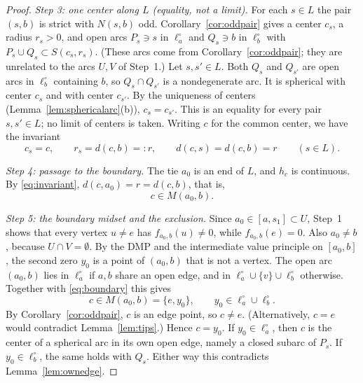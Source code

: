 \documentclass[11pt]{amsart}
\theoremstyle{definition}
\theoremstyle{remark}
\newcommand{\M}{M}
\newcommand{\N}{N}
\begin{document}
\begin{proof}
\emph{Step 3: one center along $L$ (equality, not a limit).} For each $s\in L$ the pair $(s,b)$ is strict with $\N(s,b)$ odd. Corollary~\ref{cor:oddpair} gives a center $c_s$, a radius $r_s>0$, and open arcs $P_s\ni s$ in $\ell_a^\circ$ and $Q_s\ni b$ in $\ell_b^\circ$ with $P_s\cup Q_s\subset S(c_s,r_s)$. (These arcs come from Corollary~\ref{cor:oddpair}; they are unrelated to the arcs $U,V$ of Step~1.) Let $s,s'\in L$. Both $Q_s$ and $Q_{s'}$ are open arcs in $\ell_b^\circ$ containing $b$, so $Q_s\cap Q_{s'}$ is a nondegenerate arc. It is spherical with center $c_s$ and with center $c_{s'}$. By the uniqueness of centers (Lemma~\ref{lem:sphericalarc}(b)), $c_s=c_{s'}$. This is an equality for every pair $s,s'\in L$; no limit of centers is taken. Writing $c$ for the common center, we have the invariant
\begin{equation}\label{eq:invariant}
  c_s=c,\qquad r_s=d(c,b)=:r,\qquad d(c,s)=d(c,b)=r\qquad(s\in L).
\end{equation}

\emph{Step 4: passage to the boundary.} The tie $a_0$ is an end of $L$, and $h_c$ is continuous. By \eqref{eq:invariant}, $d(c,a_0)=r=d(c,b)$, that is,
\begin{equation}\label{eq:boundary}
  c\in\M(a_0,b).
\end{equation}

\emph{Step 5: the boundary midset and the exclusion.} Since $a_0\in[a,s_1]\subset U$, Step~1 shows that every vertex $u\ne e$ has $f_{a_0,b}(u)\ne0$, while $f_{a_0,b}(e)=0$. Also $a_0\ne b$, because $U\cap V=\emptyset$. By the DMP and the intermediate value principle on $[a_0,b]$, the second zero $y_0$ is a point of $(a_0,b)$ that is not a vertex. The open arc $(a_0,b)$ lies in $\ell_a^\circ$ if $a,b$ share an open edge, and in $\ell_a^\circ\cup\{v\}\cup\ell_b^\circ$ otherwise. Together with \eqref{eq:boundary} this gives
\[
  c\in\M(a_0,b)=\{e,y_0\},\qquad y_0\in\ell_a^\circ\cup\ell_b^\circ .
\]
By Corollary~\ref{cor:oddpair}, $c$ is an edge point, so $c\ne e$. (Alternatively, $c=e$ would contradict Lemma~\ref{lem:tips}.) Hence $c=y_0$. If $y_0\in\ell_a^\circ$, then $c$ is the center of a spherical arc in its own open edge, namely a closed subarc of $P_s$. If $y_0\in\ell_b^\circ$, the same holds with $Q_s$. Either way this contradicts Lemma~\ref{lem:ownedge}.
\end{proof}
\end{document}
